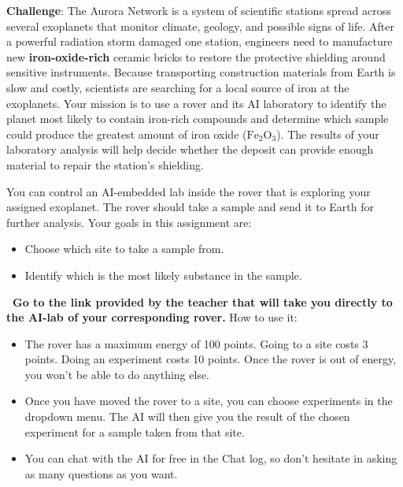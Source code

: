 \documentclass[12pt]{article}
\newcounter{exercise}
\newcommand{\exercisetitle}[2][]{%
  \refstepcounter{exercise}%
  \vspace{0.5cm}%
  \colorbox{maincolor}{%
    \makebox[\dimexpr\linewidth-2\fboxsep][l]{%
      \textcolor{white}{\faPen\ Assignment \theexercise:~ #2}%
    }%
  }%
  \if\relax\detokenize{#1}\relax\else\label{#1}\fi
  \vspace{0.3cm}%
}
\newcounter{question}
\begin{document}
\begin{importantbox}
\textbf{Challenge}: The Aurora Network is a system of scientific stations spread across several exoplanets that monitor climate, geology, and possible signs of life. After a powerful radiation storm damaged one station, engineers need to manufacture new \textbf{iron-oxide-rich} ceramic bricks to restore the protective shielding around sensitive instruments. Because transporting construction materials from Earth is slow and costly, scientists are searching for a local source of iron at the exoplanets. Your mission is to use a rover and its AI laboratory to identify the planet most likely to contain iron-rich compounds and determine which sample could produce the greatest amount of iron oxide (\(\mathrm{Fe_2O_3}\)). The results of your laboratory analysis will help decide whether the deposit can provide enough material to repair the station's shielding.
\end{importantbox}




\vspace{0.3cm}


\exercisetitle{Send a sample to Earth}

You can control an AI-embedded lab inside the rover that is exploring your assigned exoplanet. The rover should take a sample and send it to Earth for further analysis. Your goals in this assignment are:

\begin{itemize}
  \item Choose which site to take a sample from.
  \item Identify which is the most likely substance in the sample.
\end{itemize}

\textcolor{maincolor}{\textbf{\faPen\ Go to the link provided by the teacher that will take you directly to the AI-lab of your corresponding rover.}} How to use it:
\begin{itemize}
  \item The rover has a maximum energy of 100 points. Going to a site costs 3 points. Doing an experiment costs 10 points. Once the rover is out of energy, you won't be able to do anything else.

  \item Once you have moved the rover to a site, you can choose experiments in the dropdown menu. The AI will then give you the result of the chosen experiment for a sample taken from that site.

  \item You can chat with the AI for free in the Chat log, so don't hesitate in asking as many questions as you want.

\end{itemize}
\end{document}

